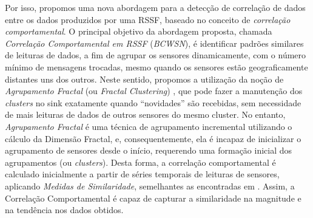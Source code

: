 \documentclass{acm_proc_article-sp}
\begin{document}
Por isso, propomos uma nova abordagem para a detecção de correlação de dados
entre os dados produzidos por uma RSSF, baseado no conceito de {\it correlação
comportamental}. O principal objetivo da abordagem proposta, chamada {\it
Correlação Comportamental em RSSF} ({\it BCWSN}), é identificar padrões similares de
leituras de dados, a fim de agrupar os sensores dinamicamente, com o número
mínimo de mensagens trocadas, mesmo quando os sensores estão geograficamente
distantes uns dos outros. Neste sentido, propomos a utilização da noção de {\it
Agrupamento Fractal} (ou {\it Fractal Clustering}) \cite{Barbara2000}, que pode
fazer a manutenção dos {\it clusters} no sink exatamente quando ``novidades'' são
recebidas, sem necessidade de mais leituras de dados de outros sensores do mesmo
cluster.
No entanto, {\it Agrupamento Fractal} é uma técnica de agrupamento incremental
utilizando o cálculo da Dimensão Fractal, e, consequentemente, ela é incapaz de
inicializar o agrupamento de sensores desde o início, requerendo uma formação
inicial dos agrupamentos (ou {\it clusters}). Desta forma, a correlação comportamental
é calculado inicialmente a partir de séries temporais de leituras de sensores,
aplicando {\it Medidas de Similaridade}, semelhantes as encontradas em
\cite{Liu2007}. Assim, a Correlação Comportamental é capaz de capturar a
similaridade na magnitude e na tendência nos dados obtidos.
\vspace*{-.3cm}
\end{document}
